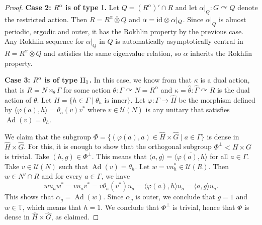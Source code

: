 \documentclass[a4paper,11pt]{amsart}
\numberwithin{equation}{section}
\theoremstyle{definition}
\newcommand{\T}{\mathbb{T}}
\newcommand{\cU}{\mathcal{U}}
\newcommand{\Ad}{\operatorname{Ad}}
\newcommand{\id}{\text{\rm id}}
\newcommand{\ovt}{\mathbin{\overline{\otimes}}}
\newcommand{\I}{{\rm I}}
\newcommand{\II}{{\rm II}}
\begin{document}
\begin{proof}
    \textbf{Case 2: $R^\alpha$ is of type $\I$.} Let $Q=(R^\alpha)' \cap R$ and let $\alpha|_Q : G \curvearrowright Q$ denote the restricted action. Then $R = R^\alpha \ovt Q$ and $\alpha = \id \otimes \alpha|_Q$. Since $\alpha|_Q$ is almost periodic, ergodic and outer, it has the Rokhlin property by the previous case. Any Rokhlin sequence for $\alpha|_Q$ in $Q$ is automatically asymptotically central in $R = R^\alpha \ovt Q$ and satisfies the same eigenvalue relation, so $\alpha$ inherits the Rokhlin property.
 
    \textbf{Case 3: $R^\alpha$ is of type $\II_1$.} 
    In this case, we know from \cite[§3]{Jo82} that $\kappa$ is a dual action, that is $R=N \rtimes_\theta \Gamma$ for some action $\theta : \Gamma \curvearrowright N=R^\alpha$ and $\kappa= \widehat{\theta} : \widehat{\Gamma} \curvearrowright R$ is the dual action of $\theta$. Let $H=\{ h \in \Gamma \mid \theta_h \text{ is inner} \}$. Let $\varphi : \Gamma \rightarrow \widehat{H}$ be the morphism defined by $\langle \varphi(a), h \rangle =\theta_a(v)v^*$ where $v \in \cU(N)$ is any unitary that satisfies $\Ad(v)=\theta_h$. 
    
    We claim that the subgroup $\Phi = \{ (\varphi(a),a) \in \widehat{H} \times \widehat{G} \mid a \in \Gamma \}$ is dense in $\widehat{H} \times \widehat{G}$. For this, it is enough to show that the orthogonal subgroup $\Phi^\perp < H \times G$ is trivial. Take $(h,g) \in \Phi^\perp$. This means that $\langle a,g \rangle  = \overline{\langle  \varphi(a),h \rangle}$ for all $a \in \Gamma$. Take $v \in \cU(N)$ such that $\Ad(v)=\theta_h$. Let $w=vu_h^* \in \cU(R)$. Then $w \in N' \cap R$ and for every $a \in \Gamma$, we have 
    $$ wu_aw^*=vu_av^*=v\theta_a(v^*)u_ a =\overline{\langle \varphi(a),h \rangle} u_a=\langle a,g \rangle u_a.$$
    This shows that $\alpha_g=\Ad(w)$. Since $\alpha_g$ is outer, we conclude that $g=1$ and $w \in \T$, which means that $h=1$. We conclude that $\Phi^\perp$ is trivial, hence that $\Phi$ is dense in $\widehat{H} \times \widehat{G}$, as claimed. 


\end{proof}
\end{document}
